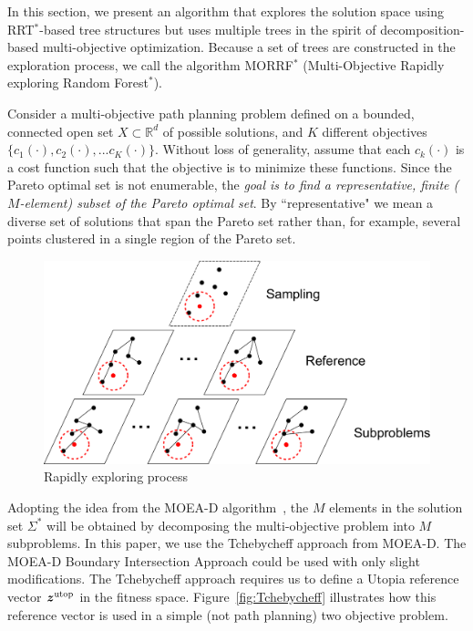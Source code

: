 \documentclass[phd]{byuprop}
\begin{document}
In this section, we present an algorithm that explores the solution space using RRT$^{*}$-based tree structures but uses multiple trees in the spirit of decomposition-based multi-objective optimization.
Because a set of trees are constructed in the exploration process, we call the algorithm MORRF$^{*}$ (Multi-Objective Rapidly exploring Random Forest$^{*}$).

Consider a multi-objective path planning problem defined on a bounded, connected open set $X\subset\mathbb{R}^d$ of possible solutions, and $K$ different objectives $\{c_{1}(\cdot), c_{2}(\cdot), ... c_{K}(\cdot)\}$. 
Without loss of generality, assume that each $c_{k}(\cdot)$ is a cost function such that the objective is to minimize these functions.  
Since the Pareto optimal set is not enumerable, the {\em goal is to find a representative, finite ($M$-element) subset of the Pareto optimal set}.  
By ``representative" we mean a diverse set of solutions that span the Pareto set rather than, for example, several points clustered in a single region of the Pareto set.  

\begin{figure}[htbp]
	\centering
	\includegraphics[width=0.6\linewidth]{./fig/MORRTstar}
	\caption{Rapidly exploring process}
	\label{fig:MORRTstar}
\end{figure}

Adopting the idea from the MOEA-D algorithm~\cite{Zhang2007}, the $M$ elements in the solution set $\Sigma^{*}$ will be obtained by decomposing the multi-objective problem into $ M $ subproblems.  
In this paper, we use the Tchebycheff approach from MOEA-D. 
The MOEA-D Boundary Intersection Approach could be used with only slight modifications. 
The Tchebycheff approach requires us to define a Utopia reference vector $ \bm{z}^{\rm utop} $ in the fitness space. 
Figure~\ref{fig:Tchebycheff} illustrates how this reference vector is used in a simple (not path planning) two objective problem.  
\end{document}
